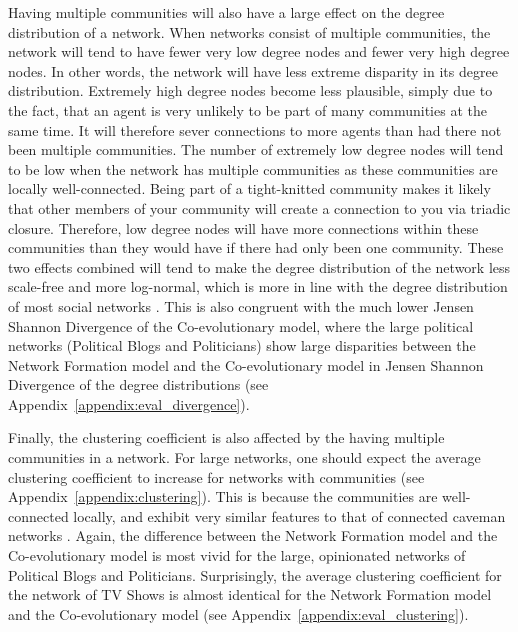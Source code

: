 \documentclass[11pt]{article}
\begin{document}
Having multiple communities will also have a large effect on the degree distribution of a network. When networks consist of multiple communities, the network will tend to have fewer very low degree nodes and fewer very high degree nodes. In other words, the network will have less extreme disparity in its degree distribution. Extremely high degree nodes become less plausible, simply due to the fact, that an agent is very unlikely to be part of many communities at the same time. It will therefore sever connections to more agents than had there not been multiple communities. The number of extremely low degree nodes will tend to be low when the network has multiple communities as these communities are locally well-connected. Being part of a tight-knitted community makes it likely that other members of your community will create a connection to you via triadic closure. Therefore, low degree nodes will have more connections within these communities than they would have if there had only been one community. 
These two effects combined will tend to make the degree distribution of the network less scale-free and more log-normal, which is more in line with the degree distribution of most social networks \cite{broido_scale-free_2019}. This is also congruent with the much lower Jensen Shannon Divergence of the Co-evolutionary model, where the large political networks (Political Blogs and Politicians) show large disparities between the Network Formation model and the Co-evolutionary model in Jensen Shannon Divergence of the degree distributions (see Appendix~\ref{appendix:eval_divergence}).

Finally, the clustering coefficient is also affected by the having multiple communities in a network. For large networks, one should expect the average clustering coefficient to increase for networks with communities (see Appendix~\ref{appendix:clustering}). This is because the communities are well-connected locally, and exhibit very similar features to that of connected caveman networks \cite{watts_networks_1999}. Again, the difference between the Network Formation model and the Co-evolutionary model is most vivid for the large, opinionated networks of Political Blogs and Politicians. Surprisingly, the average clustering coefficient for the network of TV Shows is almost identical for the Network Formation model and the Co-evolutionary model (see Appendix~\ref{appendix:eval_clustering}).
\end{document}
